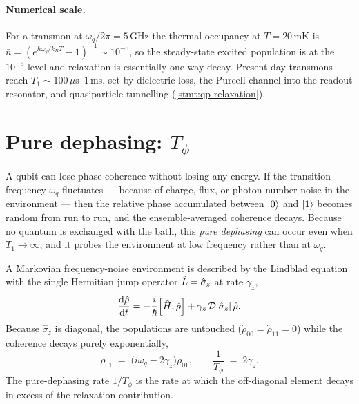 \paragraph{Numerical scale.}
For a transmon at $\omega_q/2\pi=5\,$GHz the thermal occupancy at
$T=20\,$mK is $\bar n=(e^{\hbar\omega_q/k_BT}-1)^{-1}\sim10^{-5}$, so
the steady-state excited population is at the $10^{-5}$ level and
relaxation is essentially one-way decay. Present-day transmons
reach $T_1\sim 100\,\mu$s--$1\,$ms, set by dielectric loss, the
Purcell channel into the readout resonator, and quasiparticle
tunnelling (\cref{stmt:qp-relaxation}).

\section{Pure dephasing: \texorpdfstring{$T_\phi$}{Tphi}}
\label{sec:dephasing}

\begin{phenomenon}
A qubit can lose phase coherence without losing any energy. If the
transition frequency $\omega_q$ fluctuates --- because of charge,
flux, or photon-number noise in the environment --- then the
relative phase accumulated between $\ket0$ and $\ket1$ becomes
random from run to run, and the ensemble-averaged coherence decays.
Because no quantum is exchanged with the bath, this \emph{pure
dephasing} can occur even when $T_1\to\infty$, and it probes the
environment at low frequency rather than at $\omega_q$.
\end{phenomenon}

\begin{statement}
\label{stmt:tphi}
A Markovian frequency-noise environment is described by the
Lindblad equation with the single Hermitian jump operator
$\hat{L}=\hat\sigma_z$ at rate $\gamma_z$,
\begin{equation}
\label{eq:dephasing-me}
\frac{\dd\op\rho}{\dd t}
= -\frac{i}{\hbar}\comm{\op H}{\op\rho}
+ \gamma_z\,\mathcal D[\hat\sigma_z]\,\op\rho.
\end{equation}
Because $\hat\sigma_z$ is diagonal, the populations are untouched
($\dot\rho_{00}=\dot\rho_{11}=0$) while the coherence decays purely
exponentially,
\begin{equation}
\label{eq:tphi-decay}
\dot\rho_{01} \;=\; \bigl(i\omega_q - 2\gamma_z\bigr)\rho_{01},
\qquad \frac{1}{T_\phi} \;=\; 2\gamma_z.
\end{equation}
The pure-dephasing rate $1/T_\phi$ is the rate at which the
off-diagonal element decays in excess of the relaxation
contribution.
\end{statement}

